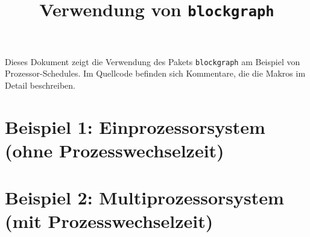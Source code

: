 \documentclass[ngerman,parskip=half]{scrartcl}
\title{Verwendung von \texttt{blockgraph}}
\date{}
\begin{document}
\maketitle

Dieses Dokument zeigt die Verwendung des Pakets \texttt{blockgraph} am Beispiel von Prozessor-Schedules. Im Quellcode befinden sich Kommentare, die die Makros im Detail beschreiben.

\section*{Beispiel 1: Einprozessorsystem (ohne Prozesswechselzeit)}

\begin{blockgraph}{15}{1}{0.4}


\end{blockgraph}



\section*{Beispiel 2: Multiprozessorsystem (mit Prozesswechselzeit)}
\end{document}
